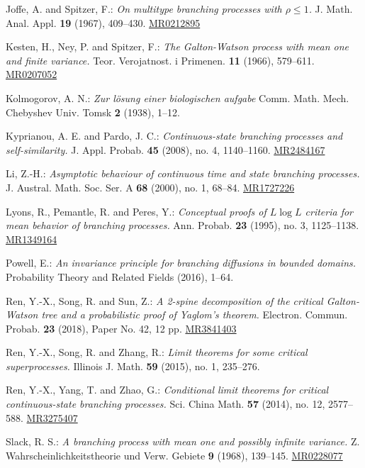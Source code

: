\documentclass[12pt,a4paper]{article}
\theoremstyle{plain}
\theoremstyle{definition}
\numberwithin{equation}{section}
\def\MR#1{\href{http://www.ams.org/mathscinet-getitem?mr=#1}{MR#1}}
\begin{document}
\begin{thebibliography}{10}
Joffe, A. and Spitzer, F.:
\emph{On multitype branching processes with $\rho \leq 1$.} 
J. Math. Anal. Appl. \textbf{19} (1967), 409–430.
\MR{0212895} 

Kesten, H., Ney, P. and Spitzer, F.:
\emph{The Galton-Watson process with mean one and finite variance.} 
Teor. Verojatnost. i Primenen. \textbf{11} (1966), 579--611.
\MR{0207052}

Kolmogorov, A. N.:
\emph{Zur lösung einer biologischen aufgabe}
Comm. Math. Mech. Chebyshev Univ. Tomsk \textbf{2} (1938), 1--12.

Kyprianou, A. E. and Pardo, J. C.:
\emph{Continuous-state branching processes and self-similarity.} 
J. Appl. Probab. \textbf{45} (2008), no. 4, 1140--1160.
\MR{2484167} 

Li, Z.-H.:
\emph{Asymptotic behaviour of continuous time and state branching processes.} 
J. Austral. Math. Soc. Ser. A \textbf{68} (2000), no. 1, 68--84.
\MR{1727226}

Lyons, R., Pemantle, R. and Peres, Y.:
\emph{Conceptual proofs of $L\log L$ criteria for mean behavior of branching processes.}
Ann. Probab. \textbf{23} (1995), no. 3, 1125--1138.
\MR{1349164}

Powell, E.: 
\emph{An invariance principle for branching diffusions in bounded domains.} 
Probability Theory and Related Fields (2016), 1--64.

Ren, Y.-X., Song, R. and Sun, Z.:
\emph{A 2-spine decomposition of the critical Galton-Watson tree and a probabilistic proof of Yaglom's theorem.} 
Electron. Commun. Probab. \textbf{23} (2018), Paper No. 42, 12 pp. 
\MR{3841403}

Ren, Y.-X., Song, R. and Zhang, R.:
\emph{Limit theorems for some critical superprocesses.}
Illinois J. Math. \textbf{59} (2015), no. 1, 235–276.

Ren, Y.-X., Yang, T. and Zhao, G.:
\emph{Conditional limit theorems for critical continuous-state branching processes.}
Sci. China Math. \textbf{57} (2014), no. 12, 2577--588. 
\MR{3275407}

Slack, R. S.:
\emph{A branching process with mean one and possibly infinite variance.}
Z. Wahrscheinlichkeitstheorie und Verw. Gebiete \textbf{9} (1968), 139--145.
\MR{0228077}


\end{thebibliography}
\end{document}
